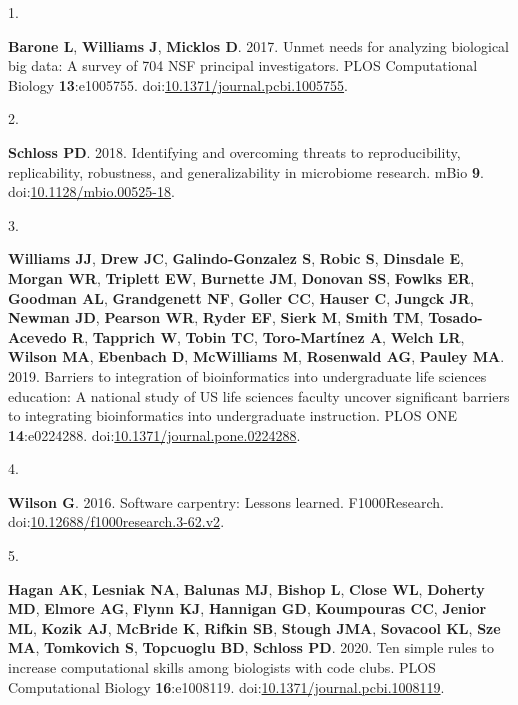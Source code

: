\documentclass[
]{article}
\newlength{\cslhangindent}
\newlength{\csllabelwidth}
\newlength{\cslentryspacingunit} %
\newenvironment{CSLReferences}[2] %
 {%
  \setlength{\parindent}{0pt}
  \ifodd #1
  \let\oldpar\par
  \def\par{\hangindent=\cslhangindent\oldpar}
  \fi
  \setlength{\parskip}{#2\cslentryspacingunit}
 }%
 {}
\newcommand{\CSLLeftMargin}[1]{\parbox[t]{\csllabelwidth}{#1}}
\newcommand{\CSLRightInline}[1]{\parbox[t]{\linewidth - \csllabelwidth}{#1}\break}
\begin{document}
\hypertarget{refs}{}
\begin{CSLReferences}{0}{1}
\leavevmode{}%
\CSLLeftMargin{1. }%
\CSLRightInline{\textbf{Barone L}, \textbf{Williams J}, \textbf{Micklos
D}. 2017. Unmet needs for analyzing biological big data: A survey of 704
{NSF} principal investigators. {PLOS} Computational Biology
\textbf{13}:e1005755.
doi:\href{https://doi.org/10.1371/journal.pcbi.1005755}{10.1371/journal.pcbi.1005755}.}

\leavevmode{}%
\CSLLeftMargin{2. }%
\CSLRightInline{\textbf{Schloss PD}. 2018. Identifying and overcoming
threats to reproducibility, replicability, robustness, and
generalizability in microbiome research. {mBio} \textbf{9}.
doi:\href{https://doi.org/10.1128/mbio.00525-18}{10.1128/mbio.00525-18}.}

\leavevmode{}%
\CSLLeftMargin{3. }%
\CSLRightInline{\textbf{Williams JJ}, \textbf{Drew JC},
\textbf{Galindo-Gonzalez S}, \textbf{Robic S}, \textbf{Dinsdale E},
\textbf{Morgan WR}, \textbf{Triplett EW}, \textbf{Burnette JM},
\textbf{Donovan SS}, \textbf{Fowlks ER}, \textbf{Goodman AL},
\textbf{Grandgenett NF}, \textbf{Goller CC}, \textbf{Hauser C},
\textbf{Jungck JR}, \textbf{Newman JD}, \textbf{Pearson WR},
\textbf{Ryder EF}, \textbf{Sierk M}, \textbf{Smith TM},
\textbf{Tosado-Acevedo R}, \textbf{Tapprich W}, \textbf{Tobin TC},
\textbf{Toro-Martínez A}, \textbf{Welch LR}, \textbf{Wilson MA},
\textbf{Ebenbach D}, \textbf{McWilliams M}, \textbf{Rosenwald AG},
\textbf{Pauley MA}. 2019. Barriers to integration of bioinformatics into
undergraduate life sciences education: A national study of {US} life
sciences faculty uncover significant barriers to integrating
bioinformatics into undergraduate instruction. {PLOS} {ONE}
\textbf{14}:e0224288.
doi:\href{https://doi.org/10.1371/journal.pone.0224288}{10.1371/journal.pone.0224288}.}

\leavevmode{}%
\CSLLeftMargin{4. }%
\CSLRightInline{\textbf{Wilson G}. 2016. Software carpentry: Lessons
learned. F1000Research.
doi:\href{https://doi.org/10.12688/f1000research.3-62.v2}{10.12688/f1000research.3-62.v2}.}

\leavevmode{}%
\CSLLeftMargin{5. }%
\CSLRightInline{\textbf{Hagan AK}, \textbf{Lesniak NA}, \textbf{Balunas
MJ}, \textbf{Bishop L}, \textbf{Close WL}, \textbf{Doherty MD},
\textbf{Elmore AG}, \textbf{Flynn KJ}, \textbf{Hannigan GD},
\textbf{Koumpouras CC}, \textbf{Jenior ML}, \textbf{Kozik AJ},
\textbf{McBride K}, \textbf{Rifkin SB}, \textbf{Stough JMA},
\textbf{Sovacool KL}, \textbf{Sze MA}, \textbf{Tomkovich S},
\textbf{Topcuoglu BD}, \textbf{Schloss PD}. 2020. Ten simple rules to
increase computational skills among biologists with code clubs. {PLOS}
Computational Biology \textbf{16}:e1008119.
doi:\href{https://doi.org/10.1371/journal.pcbi.1008119}{10.1371/journal.pcbi.1008119}.}


\end{CSLReferences}
\end{document}
